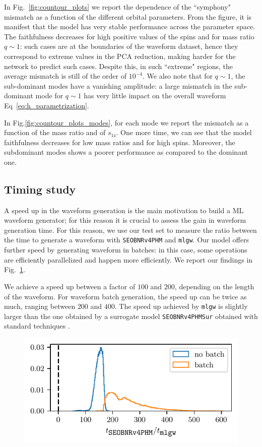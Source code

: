 \documentclass[twocolumn,showpacs,preprintnumbers,nofootinbib,prd,
superscriptaddress,10pt]{revtex4-1}
\begin{document}
{In Fig.~\ref{fig:countour_plots} we report the dependence of the ``symphony" mismatch as a function of the different orbital parameters.
From the figure, it is manifest that the model has very stable performance across the parameter space.
The faithfulness decreases for high positive values of the spins and for mass ratio $q\sim 1$: such cases are at the boundaries of the waveform dataset, hence they correspond to extreme values in the PCA reduction, making harder for the network to predict such cases. Despite this, in such ``extreme" regions, the average mismatch is still of the order of $10^{-4}$.
We also note that for $q\sim 1$, the sub-dominant modes have a vanishing amplitude: a large mismatch in the sub-dominant mode for $q\sim 1$ has very little impact on the overall waveform Eq~\eqref{eq:h_parametrization}.

In Fig.\ref{fig:countour_plots_modes}, for each mode we report the mismatch as a function of the mass ratio and of $s_\text{1z}$. One more time, we can see that the model faithfulness decreases for low mass ratios and for high spins. Moreover, the subdominant modes shows a poorer performance as compared to the dominant one.

\subsection{Timing study}
\label{sec:timing}

A speed up in the waveform generation is the main motivation to build a ML waveform generator; for this reason it is crucial to assess the gain in waveform generation time.
For this reason, we use our test set to measure the ratio between the time to generate a waveform with \texttt{SEOBNRv4PHM} and \texttt{mlgw}. Our model offers further speed by generating waveform in batches: in this case, some operations are efficiently parallelized and happen more efficiently.
We report our findings in Fig.~\ref{fig:timing_hist}.

We achieve a speed up between a factor of $100$ and $200$, depending on the length of the waveform. For waveform batch generation, the speed up can be twice as much, ranging between $200$ and $400$.
The speed up achieved by \texttt{mlgw} is slightly larger than the one obtained by a surrogate model \texttt{SEOBNRv4PHMSur} obtained with standard techniques \cite{Gadre:2022sed}.

\begin{figure}[t]
	\centering
	\includegraphics[scale = 1]{timing}
	\caption{}
	\label{fig:timing_hist}
\end{figure}

}
\end{document}
